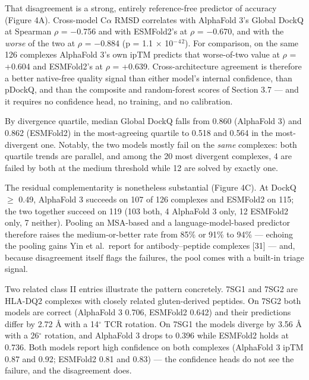 \documentclass[
  11pt,
]{article}
\begin{document}
That disagreement is a strong, entirely reference-free predictor of
accuracy (Figure 4A). Cross-model C\ensuremath{\alpha} RMSD correlates with AlphaFold 3's
Global DockQ at Spearman \ensuremath{\rho} = \ensuremath{-}0.756 and with ESMFold2's at \ensuremath{\rho} = \ensuremath{-}0.670,
and with the \emph{worse} of the two at \ensuremath{\rho} = \ensuremath{-}0.884 (p = 1.1 \ensuremath{\times} 10\ensuremath{^{-}}\ensuremath{^{4}}\ensuremath{^{2}}).
For comparison, on the same 126 complexes AlphaFold 3's own ipTM
predicts that worse-of-two value at \ensuremath{\rho} = +0.604 and ESMFold2's at \ensuremath{\rho} =
+0.639. Cross-architecture agreement is therefore a better native-free
quality signal than either model's internal confidence, than pDockQ, and
than the composite and random-forest scores of Section 3.7 --- and it
requires no confidence head, no training, and no calibration.

By divergence quartile, median Global DockQ falls from 0.860
(AlphaFold 3) and 0.862 (ESMFold2) in the most-agreeing quartile to
0.518 and 0.564 in the most-divergent one. Notably, the two models
mostly fail on the \emph{same} complexes: both quartile trends are
parallel, and among the 20 most divergent complexes, 4 are failed by
both at the medium threshold while 12 are solved by exactly one.

The residual complementarity is nonetheless substantial (Figure 4C). At
DockQ \ensuremath{\geq} 0.49, AlphaFold 3 succeeds on 107 of 126 complexes and ESMFold2
on 115; the two together succeed on 119 (103 both, 4 AlphaFold 3 only,
12 ESMFold2 only, 7 neither). Pooling an MSA-based and a
language-model-based predictor therefore raises the medium-or-better
rate from 85\% or 91\% to 94\% --- echoing the pooling gains Yin et
al.~report for antibody--peptide complexes {[}31{]} --- and, because
disagreement itself flags the failures, the pool comes with a built-in
triage signal.

Two related class II entries illustrate the pattern concretely. 7SG1 and
7SG2 are HLA-DQ2 complexes with closely related gluten-derived peptides.
On 7SG2 both models are correct (AlphaFold 3 0.706, ESMFold2 0.642) and
their predictions differ by 2.72 \AA{} with a 14\ensuremath{^{\circ}} TCR rotation. On 7SG1 the
models diverge by 3.56 \AA{} with a 26\ensuremath{^{\circ}} rotation, and AlphaFold 3 drops to
0.396 while ESMFold2 holds at 0.736. Both models report high confidence
on both complexes (AlphaFold 3 ipTM 0.87 and 0.92; ESMFold2 0.81 and
0.83) --- the confidence heads do not see the failure, and the
disagreement does.
\end{document}
